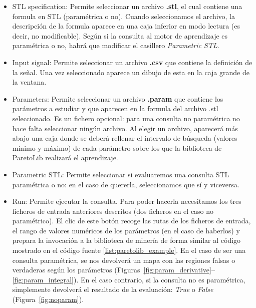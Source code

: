 \begin{itemize}
\item STL specification: Permite seleccionar un archivo \textbf{.stl}, el cual contiene una formula en STL (paramétrica o no). Cuando seleccionamos el archivo, la descripción de la formula aparece en una caja inferior en modo lectura (es decir, no modificable). Según si la consulta al motor de aprendizaje es paramétrica o no, habrá que modificar el casillero \textit{Parametric STL}.

\item Input signal: Permite seleccionar un archivo \textbf{.csv} que contiene la definición de la señal. Una vez seleccionado aparece un dibujo de esta en la caja grande de la ventana.

\item Parameters: Permite seleccionar un archivo \textbf{.param} que contiene los parámetros a estudiar y que aparecen en la formula del archivo .stl seleccionado. Es un fichero opcional: para una consulta no paramétrica no hace falta seleccionar ningún archivo. Al elegir un archivo, aparecerá más abajo una caja donde se deberá rellenar el intervalo de búsqueda (valores mínimo y máximo) de cada parámetro sobre los que la biblioteca de ParetoLib realizará el aprendizaje.

\item Parametric STL: Permite seleccionar si evaluaremos una consulta STL paramétrica o no: en el caso de quererla, seleccionamos que sí y viceversa.

\item Run: Permite ejecutar la consulta. Para poder hacerla necesitamos los tres ficheros de entrada anteriores descritos (dos ficheros en el caso no paramétrico). El clic de este botón recoge las rutas de los ficheros de entrada, el rango de valores numéricos de los parámetros (en el caso de haberlos) y prepara la invocación a la biblioteca de minería de forma similar al código mostrado en el código fuente \ref{list:paretolib_example}. En el caso de ser una consulta paramétrica, se nos devolverá un mapa con las regiones falsas o verdaderas según los parámetros (Figuras~\ref{fig:param_derivative}--\ref{fig:param_integral}). En el caso contrario, si la consulta no es paramétrica, simplemente devolverá el resultado de la evaluación: \textit{True} o \textit{False} (Figura~\ref{fig:noparam}).
\end{itemize}

%

